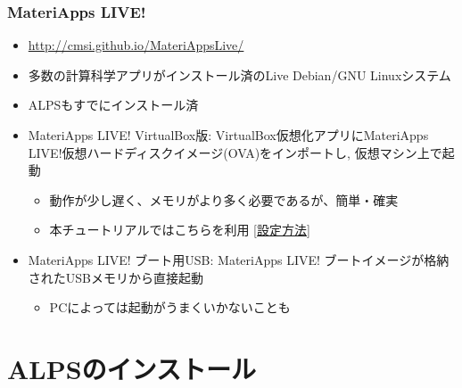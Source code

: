 \begin{frame}
 \frametitle{MateriApps LIVE!}
 \begin{itemize}
   \item \url{http://cmsi.github.io/MateriAppsLive/}
   \item 多数の計算科学アプリがインストール済のLive Debian/GNU Linuxシステム
   \item ALPSもすでにインストール済
   \item MateriApps LIVE! VirtualBox版: VirtualBox仮想化アプリにMateriApps LIVE!仮想ハードディスクイメージ(OVA)をインポートし, 仮想マシン上で起動
     \begin{itemize}
     \item 動作が少し遅く、メモリがより多く必要であるが、簡単・確実
     \item \alert{本チュートリアルではこちらを利用} [\href{https://www.slideshare.net/cms\_initiative/materiapps-live-65694832}{設定方法}]
     \end{itemize}
   \item MateriApps LIVE! ブート用USB: MateriApps LIVE! ブートイメージが格納されたUSBメモリから直接起動
     \begin{itemize}
     \item PCによっては起動がうまくいかないことも
     \end{itemize}
 \end{itemize}
\end{frame}

\section{ALPSのインストール}
\subsection*{\redm\whitem\greenb}

